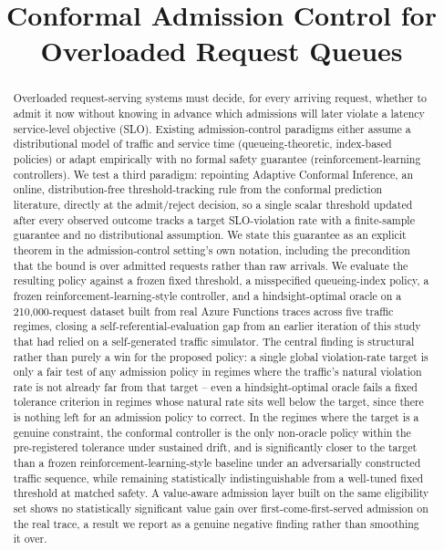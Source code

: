 \documentclass[11pt,letterpaper]{article}
\title{Conformal Admission Control for Overloaded Request Queues}
\author{}
\date{}
\begin{document}
\maketitle

\begin{abstract}
Overloaded request-serving systems must decide, for every arriving request, whether to admit it now without knowing in advance which admissions will later violate a latency service-level objective (SLO). Existing admission-control paradigms either assume a distributional model of traffic and service time (queueing-theoretic, index-based policies) or adapt empirically with no formal safety guarantee (reinforcement-learning controllers). We test a third paradigm: repointing Adaptive Conformal Inference, an online, distribution-free threshold-tracking rule from the conformal prediction literature, directly at the admit/reject decision, so a single scalar threshold updated after every observed outcome tracks a target SLO-violation rate with a finite-sample guarantee and no distributional assumption. We state this guarantee as an explicit theorem in the admission-control setting's own notation, including the precondition that the bound is over admitted requests rather than raw arrivals. We evaluate the resulting policy against a frozen fixed threshold, a misspecified queueing-index policy, a frozen reinforcement-learning-style controller, and a hindsight-optimal oracle on a 210,000-request dataset built from real Azure Functions traces across five traffic regimes, closing a self-referential-evaluation gap from an earlier iteration of this study that had relied on a self-generated traffic simulator. The central finding is structural rather than purely a win for the proposed policy: a single global violation-rate target is only a fair test of any admission policy in regimes where the traffic's natural violation rate is not already far from that target -- even a hindsight-optimal oracle fails a fixed tolerance criterion in regimes whose natural rate sits well below the target, since there is nothing left for an admission policy to correct. In the regimes where the target is a genuine constraint, the conformal controller is the only non-oracle policy within the pre-registered tolerance under sustained drift, and is significantly closer to the target than a frozen reinforcement-learning-style baseline under an adversarially constructed traffic sequence, while remaining statistically indistinguishable from a well-tuned fixed threshold at matched safety. A value-aware admission layer built on the same eligibility set shows no statistically significant value gain over first-come-first-served admission on the real trace, a result we report as a genuine negative finding rather than smoothing it over.
\end{abstract}
\end{document}
